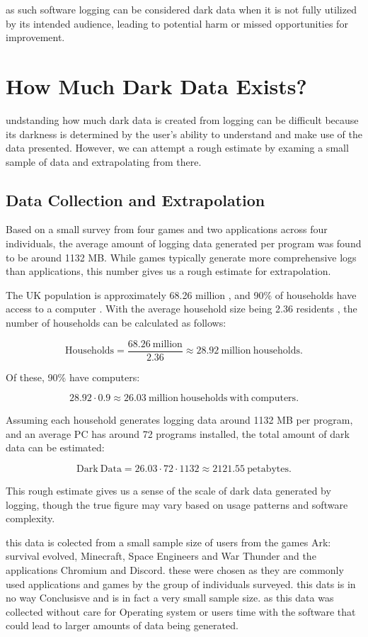 \documentclass{article}
\begin{document}
as such software logging can be considered dark data when it is not fully utilized by its intended audience, leading to potential harm or missed opportunities for 
improvement.

\section{How Much Dark Data Exists?}
undstanding how much dark data is created from logging can be difficult because its darkness is determined by the user's ability to understand and make use of 
the data presented. However, we can attempt a rough estimate by examing a small sample of data and extrapolating from there.

\subsection{Data Collection and Extrapolation}
Based on a small survey from four games and two applications across four individuals, the average amount of logging data generated per program was found to be 
around 1132 MB. While games typically generate more comprehensive logs than applications, this number gives us a rough estimate for extrapolation.

The UK population is approximately 68.26 million \parencite{ons2022population}, and 90\% of households have access to a computer \parencite{ons2022technology}. With 
the average household size being 2.36 residents \parencite{ons2023householdsize}, the number of households can be calculated as follows:

\[
\mathrm{Households} = \frac{68.26 \mathrm{ \ million}}{2.36} \approx 28.92 \mathrm{ \ million \ households}.
\]

Of these, 90\% have computers:

\[
28.92 \cdot 0.9 \approx 26.03 \mathrm{ \ million \ households \ with \ computers}.
\]

Assuming each household generates logging data around 1132 MB per program, and an average PC has around 72 programs installed, the total amount of dark data can be
estimated:

\[
\mathrm{Dark \ Data} = 26.03 \cdot 72 \cdot 1132 \approx 2121.55\mathrm{ \ petabytes}.
\]

This rough estimate gives us a sense of the scale of dark data generated by logging, though the true figure may vary based on usage patterns and software complexity.

this data is colected from a small sample size of users from the games Ark: survival evolved, Minecraft, Space Engineers and War Thunder and the applications 
Chromium and Discord. these were chosen as they are commonly used applications and games by the group of individuals surveyed. this dats is in no way Conclusisve 
and is in fact a very small sample size. as this data was collected without care for Operating system or users time with the software that could lead to larger 
amounts of data being generated.
\end{document}
